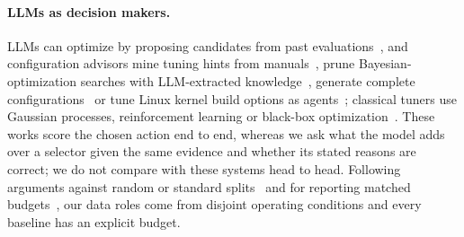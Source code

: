 \paragraph{LLMs as decision makers.}
LLMs can optimize by proposing candidates from past evaluations~\cite{Yang2024OPRO}, and configuration advisors mine tuning hints from manuals~\cite{Trummer2022DBBERT}, prune Bayesian-optimization searches with LLM-extracted knowledge~\cite{Lao2024GPTuner}, generate complete configurations~\cite{Giannakouris2025LambdaTune} or tune Linux kernel build options as agents~\cite{Chen2024AutoOS,Lin2025TuneAgent}; classical tuners use Gaussian processes, reinforcement learning or black-box optimization~\cite{VanAken2017OtterTune,Zhang2019CDBTune,Herodotou2020Survey,Snoek2012BO,Golovin2017Vizier,Lee2022STUN}. These works score the chosen action end to end, whereas we ask what the model adds over a selector given the same evidence and whether its stated reasons are correct; we do not compare with these systems head to head. Following arguments against random or standard splits~\cite{Gorman2019StandardSplits,Sogaard2021RandomSplits} and for reporting matched budgets~\cite{Dodge2019ShowYourWork}, our data roles come from disjoint operating conditions and every baseline has an explicit budget.
